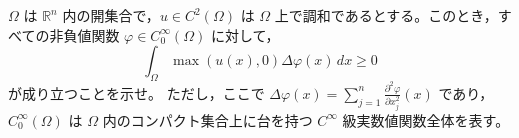 \documentclass[12pt]{jlreq}
\newcommand{\R}{\mathbb{R}}
\begin{document}
$\Omega$ は $\R^n$ 内の開集合で，$u \in C^2(\Omega)$ は $\Omega$ 上で調和であるとする。このとき，すべての非負値関数 $\varphi \in C^\infty_0(\Omega)$ に対して，
\[
  \int_\Omega \max(u(x),0) \Delta\varphi(x) \, dx \ge 0
\]
が成り立つことを示せ。
ただし，ここで $\Delta\varphi(x) = \sum_{j=1}^n \frac{\partial^2\varphi}{\partial x_j^2}(x)$ であり，$C^\infty_0(\Omega)$ は $\Omega$ 内のコンパクト集合上に台を持つ $C^\infty$ 級実数値関数全体を表す。
\end{document}

